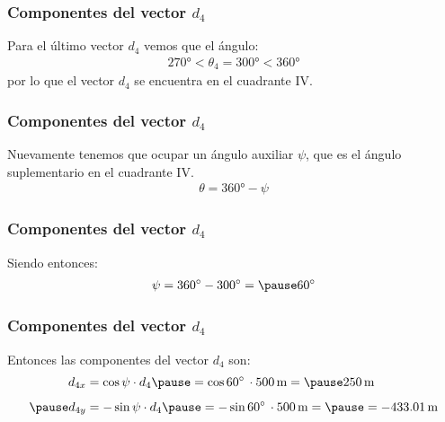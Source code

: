\documentclass[12pt]{beamer}
\begin{document}
\begin{frame}
\frametitle{Componentes del vector $d_{4}$}
Para el último vector $d_{4}$ vemos que el ángulo:
\pause
\begin{eqnarray*}
\ang{270} < \theta_{4} = \ang{300} < \ang{360}
\end{eqnarray*}
\pause
por lo que el vector $d_{4}$ se encuentra en el cuadrante IV.
\end{frame}
\begin{frame}
\frametitle{Componentes del vector $d_{4}$}
Nuevamente tenemos que ocupar un ángulo auxiliar $\psi$, que es el ángulo suplementario en el cuadrante IV.
\pause
\begin{align*}
\theta = \ang{360} - \psi
\end{align*}
\end{frame}
\begin{frame}
\frametitle{Componentes del vector $d_{4}$}
Siendo entonces:
\pause
\begin{eqnarray*}
\psi = \ang{360} - \ang{300} = \pause \ang{60}
\end{eqnarray*}
\vspace*{-1cm}
\begin{figure}
\centering
{}
\end{figure}
\end{frame}
\begin{frame}
\frametitle{Componentes del vector $d_{4}$}
\begin{figure}
  \centering
\end{figure}
Entonces las componentes del vector $d_{4}$ son:
\pause
\begin{eqnarray*}
\begin{aligned}
d_{4x} &= \cos \psi \cdot d_{4} \pause = \cos \ang{60} \, \cdot \SI{500}{\meter} = \pause \SI{250}{\meter} \\[0.5em] \pause
d_{4y} &= -\sin \psi \cdot d_{4} \pause = - \sin \ang{60} \, \cdot \SI{500}{\meter} = \pause = -\SI{433.01}{\meter}
\end{aligned}
\end{eqnarray*}
\end{frame}
\end{document}
